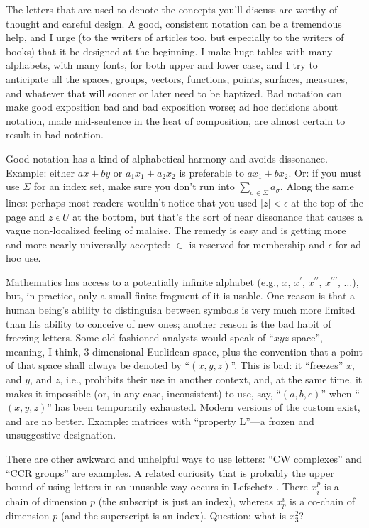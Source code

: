 \documentclass[12pt]{article}
\begin{document}
The letters that are used to denote the concepts you'll discuss are worthy of thought and careful design. A good, consistent notation can be a tremendous help, and I urge (to the writers of articles too, but especially to the writers of books) that it be designed at the beginning. I make huge tables with many alphabets, with many fonts, for both upper and lower case, and I try to anticipate all the spaces, groups, vectors, functions, points, surfaces, measures, and whatever that will sooner or later need to be baptized. Bad notation can make good exposition bad and bad exposition worse; ad hoc decisions about notation, made mid-sentence in the heat of composition, are almost certain to result in bad notation. 

Good notation has a kind of alphabetical harmony and avoids dissonance. Example: either $ax+by$ or $a_{1}x_{1}+a_{2}x_{2}$ is preferable to $ax_{1}+bx_{2}$. Or: if you must use $\Sigma$ for an index set, make sure you don't run into $\sum_{\sigma\in\Sigma}a_{\sigma}$. Along the same lines: perhaps most readers wouldn't notice that you used $|z|<\epsilon$ at the top of the page and $z \mathrel{\epsilon} U$ at the bottom, but that's the sort of near dissonance that causes a vague non-localized feeling of malaise. The remedy is easy and is getting more and more nearly universally accepted: $\in$ is reserved for membership and $\epsilon$ for ad hoc use. 

Mathematics has access to a potentially infinite alphabet (e.g., $x$, $x^{\prime}$, $x^{\prime\prime}$, $x^{\prime\prime\prime}$, $\dots$), but, in practice, only a small finite fragment of it is usable. One reason is that a human being's ability to distinguish between symbols is very much more limited than his ability to conceive of new ones; another reason is the bad habit of freezing letters. Some old-fashioned analysts would speak of ``$xyz$-space'', meaning, I think, 3-dimensional Euclidean space, plus the convention that a point of that space shall always be denoted by ``$(x,y,z)$''. This is bad: it ``freezes'' $x$, and $y$, and $z$, i.e., prohibits their use in another context, and, at the same time, it makes it impossible (or, in any case, inconsistent) to use, say, ``$(a,b,c)$'' when ``$(x,y,z)$'' has been temporarily exhausted. Modern versions of the custom exist, and are no better. Example: matrices with ``property L''---a frozen and unsuggestive designation. 

There are other awkward and unhelpful ways to use letters: ``CW complexes'' and ``CCR groups'' are examples. A related curiosity that is probably the upper bound of using letters in an unusable way occurs in Lefschetz \cite{lefschetz1942algebraic}. There $x_{i}^{p}$ is a chain of dimension $p$ (the subscript is just an index), whereas $x_{p}^{i}$ is a co-chain of dimension $p$ (and the superscript is an index). Question: what is $x_{3}^{2}$?
\end{document}
